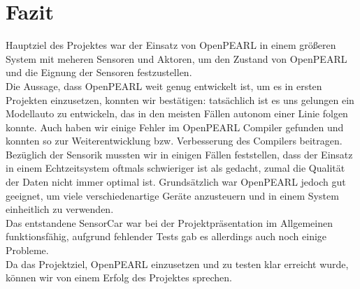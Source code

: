 \chapter{Fazit}

Hauptziel des Projektes war der Einsatz von OpenPEARL in einem größeren System mit meheren Sensoren und Aktoren, um den Zustand von OpenPEARL und die Eignung der Sensoren festzustellen.\\
Die Aussage, dass OpenPEARL weit genug entwickelt ist, um es in ersten Projekten einzusetzen, konnten wir bestätigen: tatsächlich ist es uns gelungen ein Modellauto zu entwickeln, das in den meisten Fällen autonom einer Linie folgen konnte. Auch haben wir einige Fehler im OpenPEARL Compiler gefunden und konnten so zur Weiterentwicklung bzw. Verbesserung des Compilers beitragen.\\
Bezüglich der Sensorik mussten wir in einigen Fällen feststellen, dass der Einsatz in einem Echtzeitsystem oftmals schwieriger ist als gedacht, zumal die Qualität der Daten nicht immer optimal ist. Grundsätzlich war OpenPEARL jedoch gut geeignet, um viele verschiedenartige Geräte anzusteuern und in einem System einheitlich zu verwenden.\\
Das entstandene SensorCar war bei der Projektpräsentation im Allgemeinen funktionsfähig, aufgrund fehlender Tests gab es allerdings auch noch einige Probleme.\\
Da das Projektziel, OpenPEARL einzusetzen und zu testen klar erreicht wurde, können wir von einem Erfolg des Projektes sprechen.
